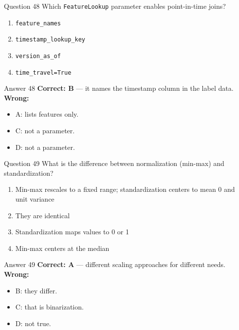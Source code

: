 \documentclass[aspectratio=169,11pt]{beamer}
\begin{document}
\begin{frame}{Question 48}
Which \texttt{FeatureLookup} parameter enables point-in-time joins?
\begin{enumerate}[label=\Alph*.]
\item \texttt{feature\_names}
\item \texttt{timestamp\_lookup\_key}
\item \texttt{version\_as\_of}
\item \texttt{time\_travel=True}
\end{enumerate}
\end{frame}
\begin{frame}{Answer 48}
\textbf{Correct: B} --- it names the timestamp column in the label data.\\
\vspace{0.5em}
\textbf{Wrong:}
\begin{itemize}
\item A: lists features only.
\item C: not a parameter.
\item D: not a parameter.
\end{itemize}
\end{frame}

\begin{frame}{Question 49}
What is the difference between normalization (min-max) and standardization?
\begin{enumerate}[label=\Alph*.]
\item Min-max rescales to a fixed range; standardization centers to mean 0 and unit variance
\item They are identical
\item Standardization maps values to 0 or 1
\item Min-max centers at the median
\end{enumerate}
\end{frame}
\begin{frame}{Answer 49}
\textbf{Correct: A} --- different scaling approaches for different needs.\\
\vspace{0.5em}
\textbf{Wrong:}
\begin{itemize}
\item B: they differ.
\item C: that is binarization.
\item D: not true.
\end{itemize}
\end{frame}
\end{document}
